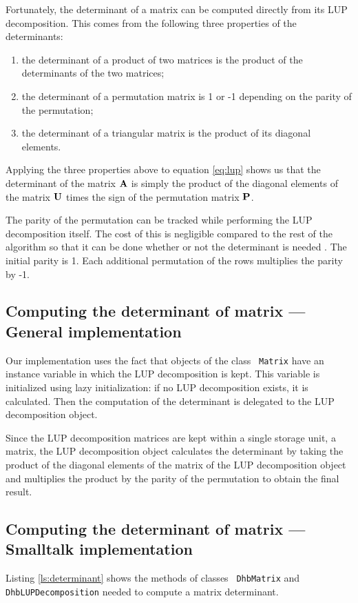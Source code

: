 \documentclass[twoside]{book}
\begin{document}
Fortunately, the determinant of a matrix can be computed directly
from its LUP decomposition. This comes from the following three
properties of the determinants:
\begin{enumerate}
  \item the determinant of a product of two matrices is the product of the determinants of the two
  matrices;
  \item the determinant of a permutation matrix is 1 or -1 depending on the parity of the
  permutation;
  \item the determinant of a triangular matrix is the product of its diagonal elements.
\end{enumerate}
Applying the three properties above to equation \ref{eq:lup} shows
us that the determinant of the matrix ${\bf A}$ is simply the
product of the diagonal elements of the matrix ${\bf U}$ times the
sign of the permutation matrix ${\bf P}$.

The parity of the permutation can be tracked while performing the
LUP decomposition itself. The cost of this is negligible compared
to the rest of the algorithm so that it can be done whether or not
the determinant is needed . The initial parity is 1. Each
additional permutation of the rows multiplies the parity by -1.

\subsection{Computing the determinant of matrix --- General implementation}
Our implementation uses the fact that objects of the class {\tt
Matrix} have an instance variable in which the LUP decomposition
is kept. This variable is initialized using lazy initialization:
if no LUP decomposition exists, it is calculated. Then the
computation of the determinant is delegated to the LUP
decomposition object.

Since the LUP decomposition matrices are kept within a single
storage unit, a matrix, the LUP decomposition object calculates
the determinant by taking the product of the diagonal elements of
the matrix of the LUP decomposition object and multiplies the
product by the parity of the permutation to obtain the final
result.

\subsection{Computing the determinant of matrix --- Smalltalk implementation}
Listing \ref{ls:determinant} shows the methods of classes {\tt
DhbMatrix} and {\tt DhbLUPDecomposition} needed to compute a
matrix determinant.
\end{document}
